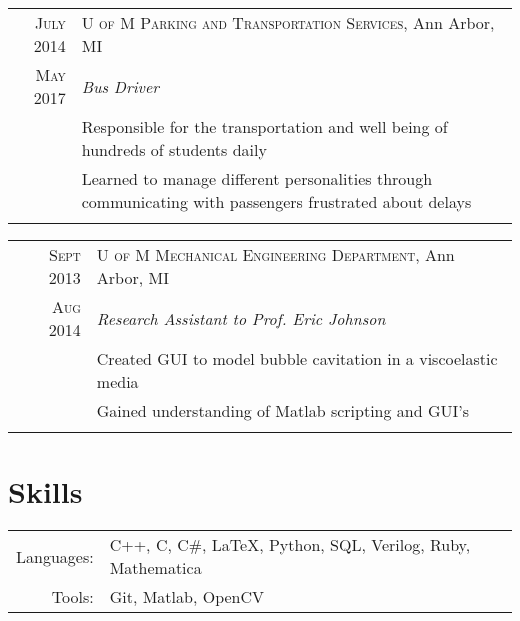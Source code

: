 \documentclass[a4paper,10pt]{article} %
\begin{document}
\begin{tabular}{r|p{13cm}}
\textsc{July 2014} & \textsc{U of M Parking and Transportation Services}, Ann Arbor, MI\\
\textsc{May 2017} & \emph{Bus Driver} \\
& \footnotesize{Responsible for the transportation and well being of hundreds
  of students daily} \\
& \footnotesize{Learned to manage different personalities through communicating
  with passengers frustrated about delays} \\
\multicolumn{2}{c}{} \\
\end{tabular}


\begin{tabular}{r|p{13cm}}
\textsc{Sept 2013} & \textsc{U of M Mechanical Engineering Department}, Ann Arbor, MI \\
\textsc{Aug 2014} & \emph{Research Assistant to Prof. Eric Johnson} \\
& \footnotesize{Created GUI to model bubble cavitation in a viscoelastic media} \\
& \footnotesize{Gained understanding of Matlab scripting and GUI's} \\
\multicolumn{2}{c}{} \\
\end{tabular}



\section{Skills}

\begin{tabular}{rl}
Languages: & C++, C, C\#, \LaTeX, Python, SQL, Verilog, Ruby, Mathematica \\
Tools: & Git, Matlab, OpenCV
\end{tabular}

\clearpage %
\end{document}

